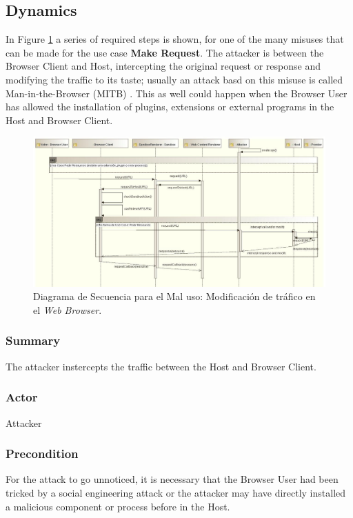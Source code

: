 \documentclass{sig-alternate-05-2015}
\begin{document}
\subsection{Dynamics}
In Figure \ref{fig:SeqMisuse} a series of required steps is shown, for one of the many misuses that can be made for the use case \textbf{Make Request}. The attacker is between the Browser Client and Host, intercepting the original request or response and modifying the traffic to its taste; usually an attack basd on this misuse is called Man-in-the-Browser (MITB) \cite{Liu2012, Barth2010, Utakrit2009, Dougan2012}. This as well could happen when the Browser User has allowed the installation of plugins, extensions or external programs in the Host and Browser Client.

\begin{figure}[h!t]
  \centering
  \includegraphics[scale=0.52]{figures/patronMisuseSeq_v2.jpg}
  \caption{Diagrama de Secuencia para el Mal uso: Modificación de tráfico en el \textit{Web Browser}.}
  \label{fig:SeqMisuse}
\end{figure}

  
  \subsubsection{Summary} The attacker instercepts the traffic between the Host and Browser Client.
  \subsubsection{Actor} Attacker
  \subsubsection{Precondition} For the attack to go unnoticed, it is necessary that the Browser User had been tricked by a social engineering attack or the attacker may have directly installed a malicious component or process before in the Host.
\end{document}
